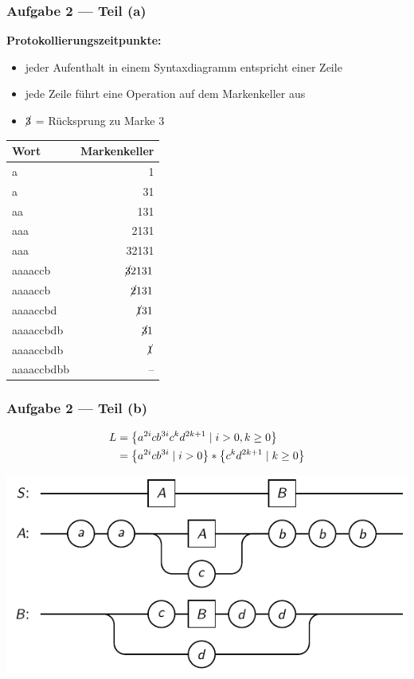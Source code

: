 \documentclass{beamer}
\begin{document}
\begin{frame} \frametitle{Aufgabe 2 --- Teil (a)}
	\begin{minipage}{\dimexpr0.5\linewidth-\fboxrule-\fboxsep}
		\small
		\textbf{Protokollierungszeitpunkte:}
		\begin{itemize}
			\item jeder Aufenthalt in einem Syntaxdiagramm entspricht einer Zeile
			\item jede Zeile führt eine Operation auf dem Markenkeller aus
			\item $\cancel{3}$ = Rücksprung zu Marke $3$
		\end{itemize}
	\end{minipage}
	\pause
	\begin{minipage}{\dimexpr0.5\linewidth-\fboxrule-\fboxsep}
		\centering
		\begin{tabular}{l|r}
			\hline
			Wort & Markenkeller \\ \hline \pause
			a & 1 \\ \pause
			a & 31 \\ \pause
			aa & 131 \\ \pause
			aaa & 2131 \\ \pause
			aaa & 32131 \\ \pause
			aaaaccb & $\cancel{3} 2131$ \\ \pause
			aaaaccb & $\cancel{2}131$ \\ \pause
			aaaaccbd & $\cancel{1}31$ \\ \pause
			aaaaccbdb & $\cancel{3}1$ \\ \pause
			aaaaccbdb & $\cancel{1}$ \\ \pause
			aaaaccbdbb & -- \\ \hline
		\end{tabular}
	\end{minipage}
\end{frame}

\begin{frame} \frametitle{Aufgabe 2 --- Teil (b)}
	\begin{align*}
		L &= \left\{ a^{2i} c b^{3i} c^k d^{2k+1} \mid i > 0, k \ge 0 \right\} \\
		&= \left\{ a^{2i} c b^{3i} \mid i > 0 \right\} * \left\{ c^k d^{2k+1} \mid k \ge 0 \right\}
	\end{align*}
	
	\centering
	\includegraphics[width=.9\textwidth]{tut02_syntax-dia-2a.pdf}
\end{frame}
\end{document}
